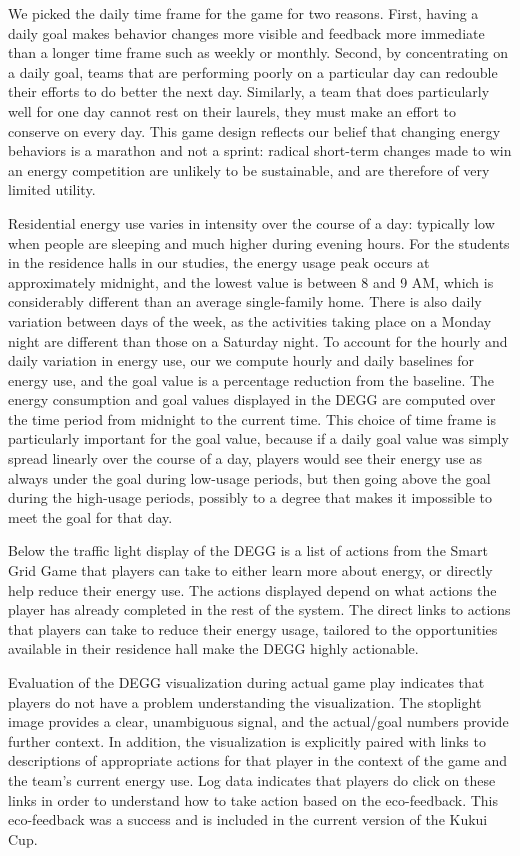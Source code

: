 \documentclass{sigchi}
\begin{document}
We picked the daily time frame for the game for two reasons. First, having a daily goal makes behavior changes more visible and feedback more immediate than a longer time frame such as weekly or monthly. Second, by concentrating on a daily goal, teams that are performing poorly on a particular day can redouble their efforts to do better the next day. Similarly, a team that does particularly well for one day cannot rest on their laurels, they must make an effort to conserve on every day. This game design reflects our belief that changing energy behaviors is a marathon and not a sprint: radical short-term changes made to win an energy competition are unlikely to be sustainable, and are therefore of very limited utility.

Residential energy use varies in intensity over the course of a day: typically low when people are sleeping and much higher during evening hours. For the students in the residence halls in our studies, the energy usage peak occurs at approximately midnight, and the lowest value is between 8 and 9 AM, which is considerably different than an average single-family home. There is also daily variation between days of the week, as the activities taking place on a Monday night are different than those on a Saturday night. To account for the hourly and daily variation in energy use, our we compute hourly and daily baselines for energy use, and the goal value is a percentage reduction from the baseline. The energy consumption and goal values displayed in the DEGG are computed over the time period from midnight to the current time. This choice of time frame is particularly important for the goal value, because if a daily goal value was simply spread linearly over the course of a day, players would see their energy use as always under the goal during low-usage periods, but then going above the goal during the high-usage periods, possibly to a degree that makes it impossible to meet the goal for that day.

Below the traffic light display of the DEGG is a list of actions from the Smart Grid Game that players can take to either learn more about energy, or directly help reduce their energy use. The actions displayed depend on what actions the player has already completed in the rest of the system. The direct links to actions that players can take to reduce their energy usage, tailored to the opportunities available in their residence hall make the DEGG highly actionable.

Evaluation of the DEGG visualization during actual game play indicates that players do not have a problem understanding the visualization. The stoplight image provides a clear, unambiguous signal, and the actual/goal numbers provide further context. In addition, the visualization is explicitly paired with links to descriptions of appropriate actions for that player in the context of the game and the team's current energy use. Log data indicates that players do click on these links in order to understand how to take action based on the eco-feedback. This eco-feedback was a success and is included in the current version of the Kukui Cup.
\end{document}
